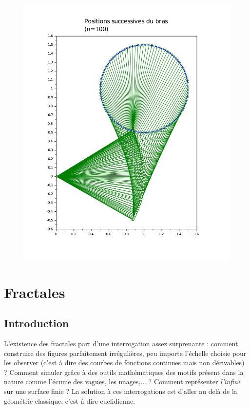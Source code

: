 \documentclass[a4paper,10pt]{report}
\begin{document}
\begin{figure}[H]
\begin{minipage}[c]{.48\linewidth}
   \centering
      \includegraphics[width=\textwidth]{graphcinematique_2.pdf}
   \end{minipage}
\label{affichage_cinematique}
\end{figure}

\chapter{Fractales}
\section{Introduction}
L'existence des fractales part d'une interrogation assez surprenante : comment construire des figures parfaitement irrégulières, peu importe l'échelle choisie pour les observer (c'est à dire des courbes de fonctions continues mais non dérivables) ? Comment simuler grâce à des outils mathématiques des motifs présent dans la nature comme l'écume des vagues, les nuages,... ? Comment représenter \textit{l'infini} sur une surface finie ? La solution à ces interrogations est d'aller au delà de la géométrie classique, c'est à dire euclidienne.
\end{document}
